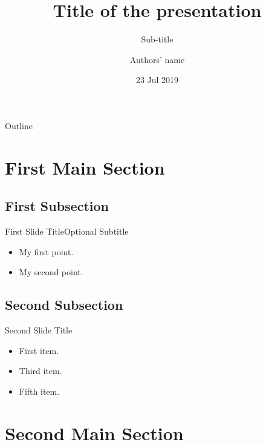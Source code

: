 \documentclass[xcolor=dvipsnames]{beamer}
\title{Title of the presentation}
\subtitle{Sub-title}
\author{Authors' name}
\institute[Shanghai Jiao Tong University] %
{
  School of Electronic Information and Electrical Engineering\\
  Shanghai Jiao Tong University
}
\date{23 Jul 2019}
\begin{document}
\begin{frame}
  \titlepage
\end{frame}


\begin{frame}{Outline}
  \tableofcontents
\end{frame}

\section{First Main Section}

\subsection{First Subsection}
\begin{frame}{First Slide Title}{Optional Subtitle}
  \begin{itemize}
  \item {
    My first point.
  }
  \item {
    My second point.
  }
  \end{itemize}
\end{frame}

\subsection{Second Subsection}
\begin{frame}{Second Slide Title}
  \begin{itemize}
  \item {
    First item.
    \pause %
  }
  \item<3-> {
    Third item.
  }
  \item<5-> {
    Fifth item. 
  }
  \end{itemize}
\end{frame}

\section{Second Main Section}
\end{document}
